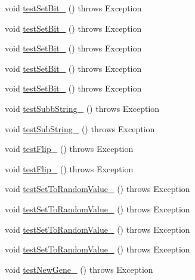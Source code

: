 \begin{DoxyCompactItemize}
void \hyperlink{classorg_1_1jgap_1_1impl_1_1_fixed_binary_gene_test_a466e5d0cd37b0d96bbc4a2c68fae59ca}{test\-Set\-Bit\-\_} ()  throws Exception 
\item 
void \hyperlink{classorg_1_1jgap_1_1impl_1_1_fixed_binary_gene_test_ad04375b08b7f2ea14baf134f7dbdbad2}{test\-Set\-Bit\-\_} ()  throws Exception 
\item 
void \hyperlink{classorg_1_1jgap_1_1impl_1_1_fixed_binary_gene_test_adc0016c2391308d114fe0599d8cabad8}{test\-Set\-Bit\-\_} ()  throws Exception 
\item 
void \hyperlink{classorg_1_1jgap_1_1impl_1_1_fixed_binary_gene_test_a96fe3d5c02ab10eb59aa29b8d529f084}{test\-Set\-Bit\-\_} ()  throws Exception 
\item 
void \hyperlink{classorg_1_1jgap_1_1impl_1_1_fixed_binary_gene_test_a0b79718fefdecef0a6bf04aa73630bd6}{test\-Set\-Bit\-\_} ()  throws Exception 
\item 
void \hyperlink{classorg_1_1jgap_1_1impl_1_1_fixed_binary_gene_test_aa5bb19b5b43df20bc67efa1fd81498b0}{test\-Subb\-String\-\_} ()  throws Exception 
\item 
void \hyperlink{classorg_1_1jgap_1_1impl_1_1_fixed_binary_gene_test_a7ae8e625e8bdb190ac69e3e487d02f37}{test\-Sub\-String\-\_} ()  throws Exception 
\item 
void \hyperlink{classorg_1_1jgap_1_1impl_1_1_fixed_binary_gene_test_abefdd0d689755be0e7eebf5f60519739}{test\-Flip\-\_} ()  throws Exception 
\item 
void \hyperlink{classorg_1_1jgap_1_1impl_1_1_fixed_binary_gene_test_a036c79a18e79f45cdd9e7361af93ea42}{test\-Flip\-\_} ()  throws Exception 
\item 
void \hyperlink{classorg_1_1jgap_1_1impl_1_1_fixed_binary_gene_test_aff89447ca3c52da7210846c221369643}{test\-Set\-To\-Random\-Value\-\_} ()  throws Exception 
\item 
void \hyperlink{classorg_1_1jgap_1_1impl_1_1_fixed_binary_gene_test_aff819c209a4f5a00915150c95c4bc630}{test\-Set\-To\-Random\-Value\-\_} ()  throws Exception 
\item 
void \hyperlink{classorg_1_1jgap_1_1impl_1_1_fixed_binary_gene_test_a7de8282d1b990db138e241632cbfa666}{test\-Set\-To\-Random\-Value\-\_} ()  throws Exception 
\item 
void \hyperlink{classorg_1_1jgap_1_1impl_1_1_fixed_binary_gene_test_a60277b97d98313608edcfcb9e5f1ff7c}{test\-Set\-To\-Random\-Value\-\_} ()  throws Exception 
\item 
void \hyperlink{classorg_1_1jgap_1_1impl_1_1_fixed_binary_gene_test_a297c4a3ccf6c7b8e5521eee664190cb1}{test\-New\-Gene\-\_} ()  throws Exception 

\end{DoxyCompactItemize}
